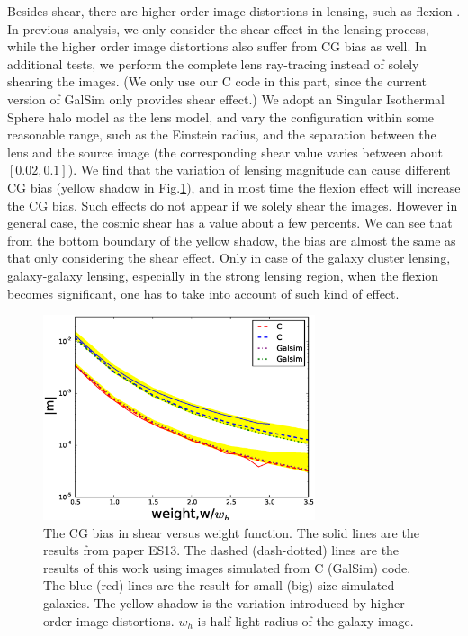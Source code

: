 \documentclass[useAMS,usenatbib]{mn2e}
\begin{document}
Besides shear, there are higher order image distortions in lensing,
such as flexion \citep[e.g.][]{2002ApJ...564...65G,bacon2006}. In
previous analysis, we only consider the shear effect in the lensing
process, while the higher order image distortions also suffer from CG
bias as well. In additional tests, we perform the complete lens
ray-tracing instead of solely shearing the images. (We only use our C
code in this part, since the current version of GalSim only provides
shear effect.) We adopt an Singular Isothermal Sphere halo model as
the lens model, and vary the configuration within some reasonable
range, such as the Einstein radius, and the separation between the
lens and the source image (the corresponding shear value varies
between about $[0.02, 0.1]$). We find that the variation of lensing
magnitude can cause different CG bias (yellow shadow in
Fig.\ref{fig:biasofweight}), and in most time the flexion effect will
increase the CG bias. Such effects do not appear if we solely shear
the images. However in general case, the cosmic shear has a value
about a few percents. We can see that from the bottom boundary of the
yellow shadow, the bias are almost the same as that only considering
the shear effect. Only in case of the galaxy cluster lensing,
galaxy-galaxy lensing, especially in the strong lensing region, when
the flexion becomes significant, one has to take into account of such
kind of effect.


%
\begin{figure}
\centerline{\includegraphics[width=8.0cm]{cvsgalsim.eps}}
\caption{The CG bias in shear versus weight function.  The
  solid lines are the results from paper ES13. The dashed
  (dash-dotted) lines are the results of this work using images
  simulated from C (GalSim) code. The blue (red) lines are the result
  for small (big) size simulated galaxies. The yellow shadow is the
  variation introduced by higher order image distortions. $w_h$ is
  half light radius of the galaxy image.}
\label{fig:biasofweight}
\end{figure}
\end{document}
